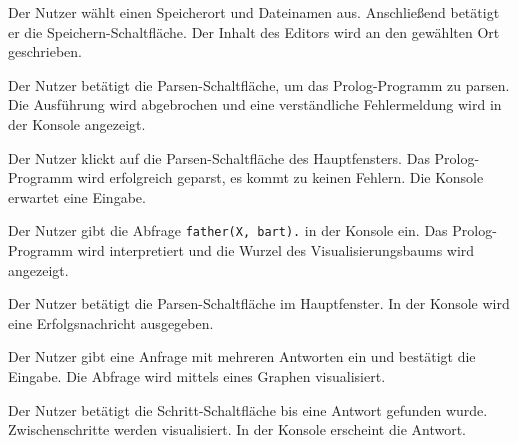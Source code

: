 \documentclass[parskip=full,11pt,twoside]{scrartcl}
\begin{document}
{Der Nutzer wählt einen Speicherort und Dateinamen aus. Anschließend betätigt er die Speichern-Schaltfläche.}
{Der Inhalt des Editors wird an den gewählten Ort geschrieben.}



{Der Nutzer betätigt die Parsen-Schaltfläche, um das Prolog-Programm zu parsen.}
{Die Ausführung wird abgebrochen und eine verständliche Fehlermeldung wird in der Konsole angezeigt.}



{Der Nutzer klickt auf die Parsen-Schaltfläche des Hauptfensters.}
{Das Prolog-Programm wird erfolgreich geparst, es kommt zu keinen Fehlern. Die Konsole erwartet eine Eingabe.}

{Der Nutzer gibt die Abfrage \texttt{father(X, bart).} in der Konsole ein.}
{Das Prolog-Programm wird interpretiert und die Wurzel des Visualisierungsbaums wird angezeigt.}



{Der Nutzer betätigt die Parsen-Schaltfläche im Hauptfenster.}
{In der Konsole wird eine Erfolgsnachricht ausgegeben.}

{Der Nutzer gibt eine Anfrage mit mehreren Antworten ein und bestätigt die Eingabe.}
{Die Abfrage wird mittels eines Graphen visualisiert.}

{Der Nutzer betätigt die Schritt-Schaltfläche bis eine Antwort gefunden wurde.}
{Zwischenschritte werden visualisiert. In der Konsole erscheint die Antwort.}
\end{document}

